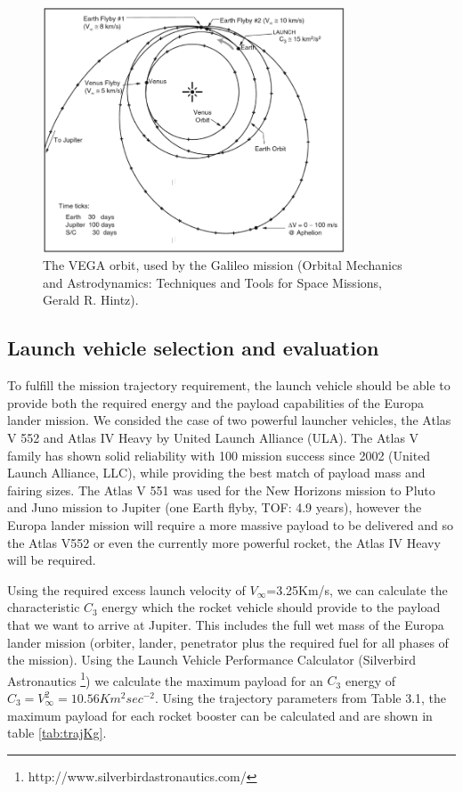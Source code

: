 \begin{figure}[htb!]
\centering
\includegraphics[width=0.8\textwidth]{figures/Orbiter/VEEGA.png}
\caption{The  VEGA orbit, used by the Galileo mission (Orbital Mechanics and Astrodynamics: Techniques and Tools for Space Missions, Gerald R. Hintz).}
\end{figure}
\subsection{Launch vehicle selection and evaluation}
To fulfill the mission trajectory requirement, the launch vehicle should be able to provide both the required energy and the payload capabilities of the Europa lander mission. We consided the case of two powerful launcher vehicles, the Atlas V 552 and Atlas IV Heavy by United Launch Alliance (ULA). The Atlas V family has shown solid reliability with 100 mission success since 2002 (United Launch Alliance, LLC), while providing the best match of payload mass and fairing sizes. The Atlas V 551 was used for the New Horizons mission to Pluto and Juno mission to Jupiter (one Earth flyby, TOF: 4.9 years), however the Europa lander mission will require a more massive payload to be delivered and so the Atlas V552 or even the currently more powerful rocket, the Atlas IV Heavy will be required. 

Using the required excess launch velocity of  $V_{\infty}$=3.25Km/s, we can calculate the characteristic $C_3$ energy which the rocket vehicle should provide to the payload that we want to arrive at Jupiter. This includes the full wet mass of the Europa lander mission (orbiter, lander, penetrator plus the required fuel for all phases of the mission). Using the Launch Vehicle Performance Calculator (Silverbird Astronautics \footnote{http://www.silverbirdastronautics.com/}) 
we calculate the maximum payload for an $C_3$ energy of $C_{3}=V_{\infty}^{2}=10.56 Km^2sec^{-2}$. Using the trajectory parameters from Table 3.1, the maximum payload for each rocket booster can be calculated and are shown in table \ref{tab:trajKg}.

